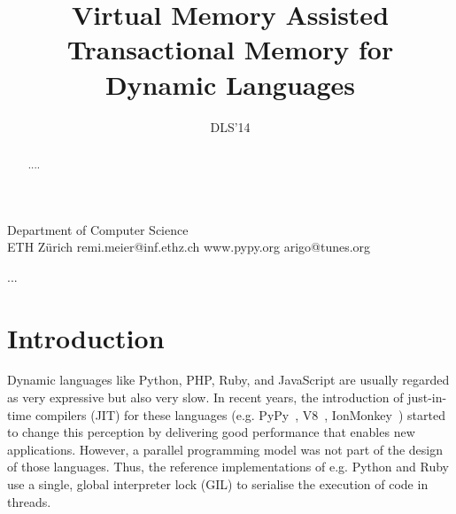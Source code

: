 \documentclass{sigplanconf}
\begin{document}
\setlength{\pdfpageheight}{\paperheight}
\setlength{\pdfpagewidth}{\paperwidth}






\title{Virtual Memory Assisted Transactional Memory for Dynamic Languages}
\subtitle{DLS'14}

           {Department of Computer Science\\ ETH Zürich}
           {remi.meier@inf.ethz.ch}
           {www.pypy.org}
           {arigo@tunes.org}

\maketitle

\begin{abstract}
....
\end{abstract}



\keywords
...

\section{Introduction}


Dynamic languages like Python, PHP, Ruby, and JavaScript are usually
regarded as very expressive but also very slow. In recent years, the
introduction of just-in-time compilers (JIT) for these languages (e.g.
PyPy~\cite{cfbolz09}, V8~\cite{kevin10}, IonMonkey~\cite{ionmonkey})
started to change this perception by delivering
good performance that enables new applications. However, a parallel
programming model was not part of the design of those languages. Thus,
the reference implementations of e.g. Python and Ruby use a single,
global interpreter lock (GIL) to serialise the execution of code in
threads.
\end{document}
